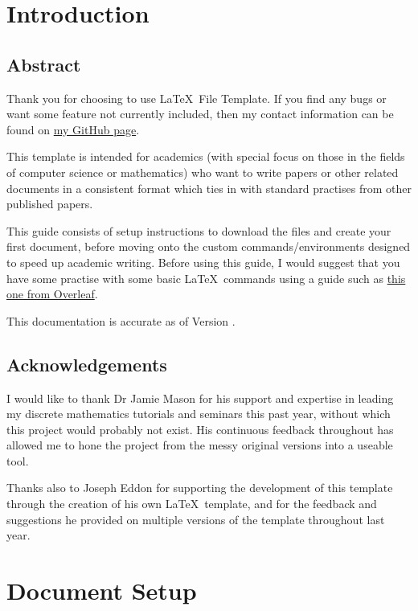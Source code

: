 \section{Introduction}

\subsection*{Abstract}

Thank you for choosing to use \LaTeX\ File Template. If you find any bugs or want some feature not currently included, then my contact information can be found on \href{https://github.com/MatthewEmer}{my GitHub page}.

This template is intended for academics (with special focus on those in the fields of computer science or mathematics) who want to write papers or other related documents in a consistent format which ties in with standard practises from other published papers. 

This guide consists of setup instructions to download the files and create your first document, before moving onto the custom commands/environments designed to speed up academic writing. Before using this guide, I would suggest that you have some practise with some basic \LaTeX\ commands using a guide such as \href{https://www.overleaf.com/learn}{this one from Overleaf}.

This documentation is accurate as of Version \templateversion.

\subsection*{Acknowledgements}

I would like to thank Dr Jamie Mason for his support and expertise in leading my discrete mathematics tutorials and seminars this past year, without which this project would probably not exist. His continuous feedback throughout has allowed me to hone the project from the messy original versions into a useable tool.

Thanks also to Joseph Eddon for supporting the development of this template through the creation of his own \LaTeX\ template, and for the feedback and suggestions he provided on multiple versions of the template throughout last year.

\newpage\section{Document Setup}

